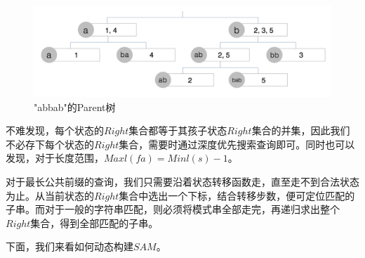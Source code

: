 ﻿\documentclass{sysuthesis}
\begin{document}
\begin{figure}[htbp]
	\centering
	\includegraphics[scale=0.3]{image/partree.png}
	\caption{"abbab"的Parent树}\label{image:partree}
\end{figure}

不难发现，每个状态的$Right$集合都等于其孩子状态$Right$集合的并集，因此我们不必存下每个状态的$Right$集合，需要时通过深度优先搜索查询即可。同时也可以发现，对于长度范围，$Maxl(fa) = Minl(s) - 1$。\par
对于最长公共前缀的查询，我们只需要沿着状态转移函数走，直至走不到合法状态为止。从当前状态的$Right$集合中选出一个下标，结合转移步数，便可定位匹配的子串。而对于一般的字符串匹配，则必须将模式串全部走完，再递归求出整个$Right$集合，得到全部匹配的子串。\par
下面，我们来看如何动态构建$SAM$。
\end{document}
